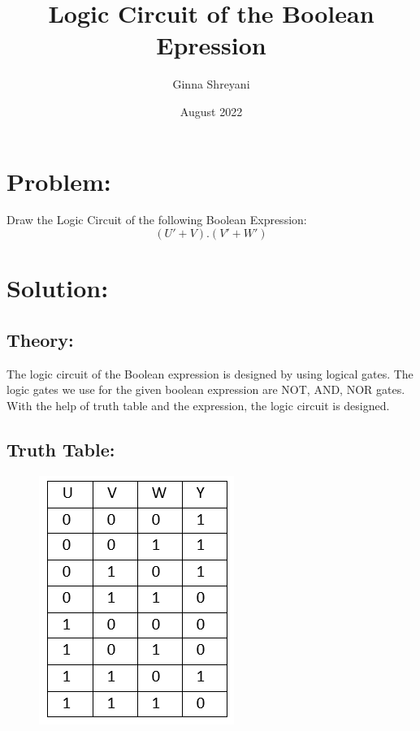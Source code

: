 \documentclass[a4paper,12pt,twocolumn]{article}
\title{Logic Circuit of the Boolean Epression}
\author{Ginna Shreyani}
\date{August 2022}
\begin{document}
\maketitle

\section{Problem:}
Draw the Logic Circuit of the following Boolean Expression:\\
\begin{equation} (U'+V).(V'+W')\end{equation}
\maketitle
\section{Solution:}
\subsection{Theory:}
The logic circuit of the Boolean expression is designed by using logical gates. The logic gates we use for the given boolean expression are NOT, AND, NOR gates. With the help of truth table and the expression, the logic circuit is designed. 
\subsection{Truth Table:}
\begin{figure}[h]
\centering
\includegraphics[width=1.0\columnwidth]{ttable}
\label{Truth Table}
\end{figure}
\end{document}
